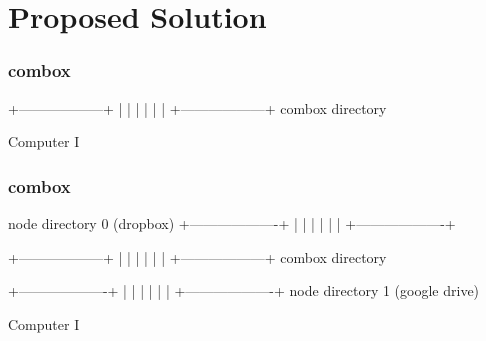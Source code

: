 
\section{Proposed Solution}

\begin{frame}[fragile]
  \frametitle{combox}

  {\tiny
  \begin{semiverbatim}










 +------------------+
 |                  |
 |                  |
 |                  |
 +------------------+
     combox directory










  Computer I
  \end{semiverbatim}
  }

\end{frame}


\begin{frame}[fragile]
  \frametitle{combox}

  {\tiny
  \begin{semiverbatim}

         node directory 0
         (dropbox)
        +-------------------+
        |                   |
        |                   |
        |                   |
        +-------------------+


 +------------------+
 |                  |
 |                  |
 |                  |
 +------------------+
     combox directory


        +-------------------+
        |                   |
        |                   |
        |                   |
        +-------------------+
         node directory 1
         (google drive)

  Computer I
  \end{semiverbatim}
  }

\end{frame}


